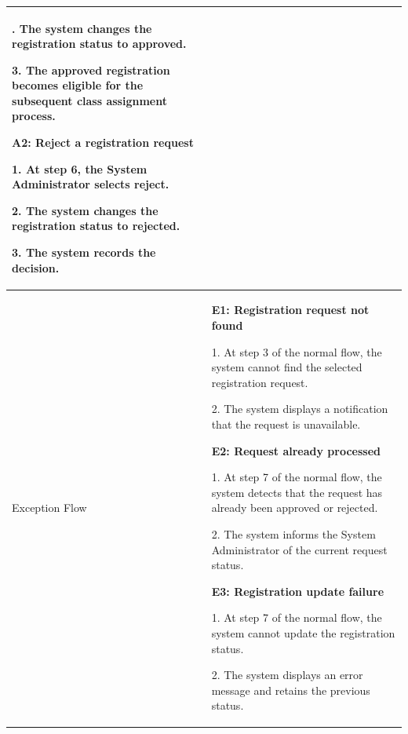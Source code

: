 \begin{longtable}{|>{\bfseries\raggedright\arraybackslash}p{}|>{\raggedright\arraybackslash}p{}|}
2. The system changes the registration status to approved. \par
3. The approved registration becomes eligible for the subsequent class assignment process. \par\vspace{4pt}
\textbf{A2: Reject a registration request} \par
1. At step 6, the System Administrator selects reject. \par
2. The system changes the registration status to rejected. \par
3. The system records the decision. \\ \hline
Exception Flow &
\textbf{E1: Registration request not found} \par
1. At step 3 of the normal flow, the system cannot find the selected registration request. \par
2. The system displays a notification that the request is unavailable. \par\vspace{4pt}
\textbf{E2: Request already processed} \par
1. At step 7 of the normal flow, the system detects that the request has already been approved or rejected. \par
2. The system informs the System Administrator of the current request status. \par\vspace{4pt}
\textbf{E3: Registration update failure} \par
1. At step 7 of the normal flow, the system cannot update the registration status. \par
2. The system displays an error message and retains the previous status. \\ \hline
\end{longtable}


